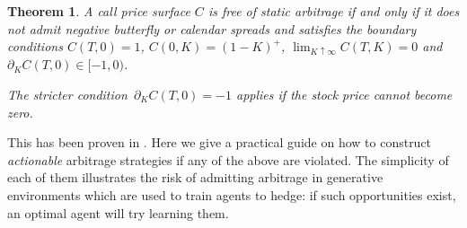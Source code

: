\documentclass[11pt,a4paper]{article}
\newtheorem{theorem}[definition]{Theorem}
\begin{document}
\begin{theorem}\label{th:arbfree}
A call price surface $C$ is free of static arbitrage if and only if 
it does not admit negative butterfly or calendar
spreads and satisfies the boundary conditions
$C(T,0)=1$, $C(0,K)=(1-K)^+$, $\lim_{K\uparrow\infty} C(T,K)=0$ and $\partial_K C(T,0)\in[-1,0)$.

The stricter condition~$\partial_K C(T,0)=-1$ applies if the stock price cannot become zero.
\end{theorem}

This has been proven in \cite{DLV}. Here we give a practical
guide on how to construct \emph{actionable} arbitrage strategies if any of the above 
are violated. The simplicity of each of them illustrates the risk of admitting
arbitrage in generative environments which are used to train agents to hedge: if such 
opportunities exist, an optimal agent will try learning them.
\end{document}
